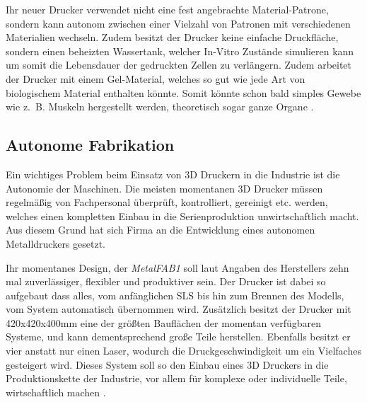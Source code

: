 Ihr neuer Drucker verwendet nicht eine fest angebrachte Material-Patrone, sondern kann autonom zwischen einer Vielzahl von Patronen mit verschiedenen Materialien wechseln. Zudem besitzt der Drucker keine einfache Druckfläche, sondern einen beheizten Wassertank, welcher In-Vitro Zustände simulieren kann um somit die Lebensdauer der gedruckten Zellen zu verlängern. Zudem arbeitet der Drucker mit einem Gel-Material, welches so gut wie jede Art von biologischem Material enthalten könnte. Somit könnte schon bald simples Gewebe wie z.~B. Muskeln hergestellt werden, theoretisch sogar ganze Organe \parencite{10_BIOPRINT}.

\subsection{Autonome Fabrikation}
Ein wichtiges Problem beim Einsatz von 3D Druckern in die Industrie ist die Autonomie der Maschinen. Die meisten momentanen 3D Drucker müssen regelmäßig von Fachpersonal überprüft, kontrolliert, gereinigt etc. werden, welches einen kompletten Einbau in die Serienproduktion unwirtschaftlich macht. Aus diesem Grund hat sich Firma  an die Entwicklung eines autonomen Metalldruckers gesetzt. 

Ihr momentanes Design, der \emph{MetalFAB1} soll laut Angaben des Herstellers zehn mal zuverlässiger, flexibler und produktiver sein. Der Drucker ist dabei so aufgebaut dass alles, vom anfänglichen SLS bis hin zum Brennen des Modells, vom System automatisch übernommen wird. Zusätzlich besitzt der Drucker mit 420x420x400mm eine der größten Bauflächen der momentan verfügbaren Systeme, und kann dementsprechend große Teile herstellen. Ebenfalls besitzt er vier anstatt nur einen Laser, wodurch die Druckgeschwindigkeit um ein Vielfaches gesteigert wird.
Dieses System soll so den Einbau eines 3D Druckers in die Produktionskette der Industrie, vor allem für komplexe oder individuelle Teile, wirtschaftlich machen \parencite{MetalFAB}.